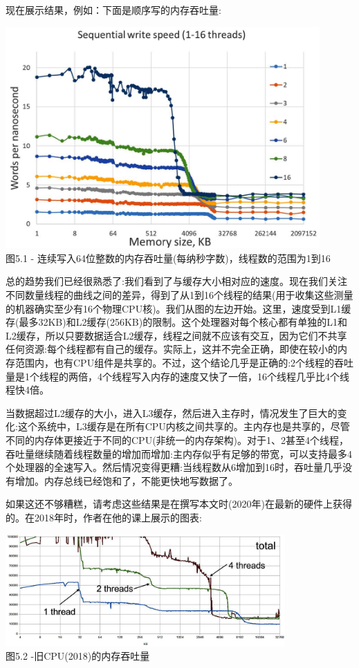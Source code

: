 现在展示结果，例如：下面是顺序写的内存吞吐量:

\begin{center}
\includegraphics[width=0.9\textwidth]{content/1/chapter5/images/1.jpg}\\
图5.1 - 连续写入64位整数的内存吞吐量(每纳秒字数)，线程数的范围为1到16
\end{center}

总的趋势我们已经很熟悉了:我们看到了与缓存大小相对应的速度。现在我们关注不同数量线程的曲线之间的差异，得到了从1到16个线程的结果(用于收集这些测量的机器确实至少有16个物理CPU核)。我们从图的左边开始。这里，速度受到L1缓存(最多32KB)和L2缓存(256KB)的限制。这个处理器对每个核心都有单独的L1和L2缓存，所以只要数据适合L2缓存，线程之间就不应该有交互，因为它们不共享任何资源:每个线程都有自己的缓存。实际上，这并不完全正确，即使在较小的内存范围内，也有CPU组件是共享的。不过，这个结论几乎是正确的:2个线程的吞吐量是1个线程的两倍，4个线程写入内存的速度又快了一倍，16个线程几乎比4个线程快4倍。

当数据超过L2缓存的大小，进入L3缓存，然后进入主存时，情况发生了巨大的变化:这个系统中，L3缓存是在所有CPU内核之间共享的。主内存也是共享的，尽管不同的内存体更接近于不同的CPU(非统一的内存架构)。对于1、2甚至4个线程，吞吐量继续随着线程数量的增加而增加:主内存似乎有足够的带宽，可以支持最多4个处理器的全速写入。然后情况变得更糟:当线程数从6增加到16时，吞吐量几乎没有增加。内存总线已经饱和了，不能更快地写数据了。

如果这还不够糟糕，请考虑这些结果是在撰写本文时(2020年)在最新的硬件上获得的。在2018年时，作者在他的课上展示的图表:

\begin{center}
\includegraphics[width=0.8\textwidth]{content/1/chapter5/images/2.jpg}\\
图5.2 -旧CPU(2018)的内存吞吐量
\end{center}

